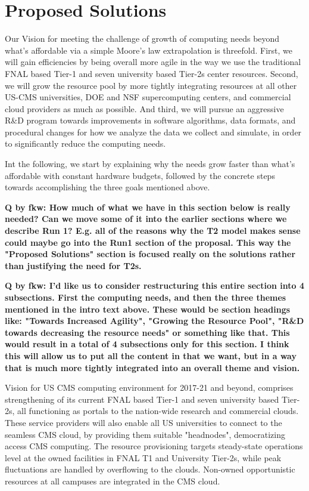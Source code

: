 \section{Proposed Solutions}

Our Vision for meeting the challenge of growth of computing needs beyond what's affordable via a simple
Moore's law extrapolation is threefold. First, we will gain efficiencies by being overall more agile in the way we use the traditional
FNAL based Tier-1 and seven university based Tier-2s center resources. Second, we will grow the resource pool by more tightly 
integrating resources at all other US-CMS universities, DOE and NSF supercomputing centers, and commercial cloud providers 
as much as possible. And third, we will pursue an aggressive R\&D program towards improvements in software algorithms, data formats,
and procedural changes for how we analyze the data we collect and simulate, in order to significantly reduce the computing needs.

Int the following, we start by explaining why the needs grow faster than what's affordable with constant hardware budgets, followed
by the concrete steps towards accomplishing the three goals mentioned above.

{\bf Q by fkw: How much of what we have in this section below is really needed? Can we move some of it into the earlier sections
where we describe Run 1? E.g. all of the reasons why the T2 model makes sense could maybe go into the Run1 section of the proposal.
This way the "Proposed Solutions" section is focused really on the solutions rather than justifying the need for T2s.}

{\bf Q by fkw: I'd like us to consider restructuring this entire section into 4 subsections. First the computing needs, and then the three themes
mentioned in the intro text above. These would be section headings like:
"Towards Increased Agility", "Growing the Resource Pool", "R\&D towards decreasing the resource needs" or something like that.  
This would result in a total of 4 subsections only for this section.
I think this will allow us to put all the content in that we want, but in a way that is much more tightly
integrated into an overall theme and vision.}

Vision for US CMS computing environment for 2017-21 and beyond, comprises
strengthening of its current FNAL based Tier-1 and seven university based
Tier-2s, all functioning as portals to the nation-wide research and commercial
clouds. These service providers will also enable all US universities to 
connect to the seamless CMS cloud, by providing them suitable 
"headnodes", democratizing access CMS computing. The resource 
provisioning targets steady-state operations level  at the owned facilities in
FNAL T1 and University Tier-2s, while peak fluctuations are handled by 
overflowing to the clouds. Non-owned opportunistic resources at all 
campuses are integrated in the CMS cloud.

